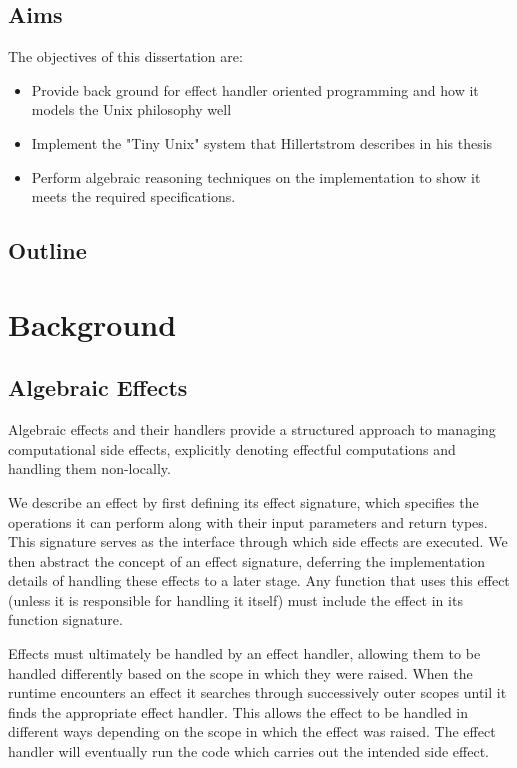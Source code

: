 \documentclass[logo,bsc,singlespacing,parskip]{infthesis}
\begin{document}
\section{Aims}
The objectives of this dissertation are:
\begin{itemize}
    \item Provide back ground for effect handler oriented programming and how it models the Unix philosophy well
    \item Implement the "Tiny Unix" system that Hillertstrom describes in his thesis
    \item Perform algebraic reasoning techniques on the implementation to show it meets the required specifications. 
    
\end{itemize}

\section{Outline}


\chapter{Background}

\section{Algebraic Effects}

Algebraic effects \cite{plotkin_handling_2013} and their handlers \cite{pretnar_introduction_2015} provide a structured approach to managing computational side effects, explicitly denoting effectful computations and handling them non-locally.

We describe an effect by first defining its effect signature, which specifies the operations it can perform along with their input parameters and return types. This signature serves as the interface through which side effects are executed. We then abstract the concept of an effect signature, deferring the implementation details of handling these effects to a later stage. Any function that uses this effect (unless it is responsible for handling it itself) must include the effect in its function signature. 

Effects must ultimately be handled by an effect handler, allowing them to be handled differently based on the scope in which they were raised. When the runtime encounters an effect it searches through successively outer scopes until it finds the appropriate effect handler. This allows the effect to be handled in different ways depending on the scope in which the effect was raised. The effect handler will eventually run the code which carries out the intended side effect. 
\end{document}
